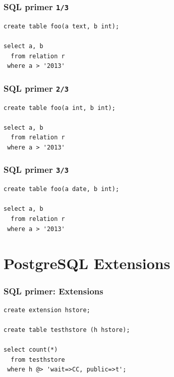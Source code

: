 \documentclass{beamer}
\begin{document}
\begin{frame}[fragile]
  \frametitle{SQL primer \texttt{1/3}}

  \vfill

\begin{verbatim}
create table foo(a text, b int);

select a, b
  from relation r
 where a > '2013'
\end{verbatim}
\end{frame}

\begin{frame}[fragile]
  \frametitle{SQL primer \texttt{2/3}}

  \vfill

\begin{verbatim}
create table foo(a int, b int);

select a, b
  from relation r
 where a > '2013'
\end{verbatim}
\end{frame}

\begin{frame}[fragile]
  \frametitle{SQL primer \texttt{3/3}}

  \vfill

\begin{verbatim}
create table foo(a date, b int);

select a, b
  from relation r
 where a > '2013'
\end{verbatim}
\end{frame}

\section{PostgreSQL Extensions}

\begin{frame}[fragile]
  \frametitle{SQL primer: Extensions}

\begin{verbatim}
create extension hstore;

create table testhstore (h hstore);

select count(*)
  from testhstore
 where h @> 'wait=>CC, public=>t';
\end{verbatim}
\end{frame}

\end{document}
